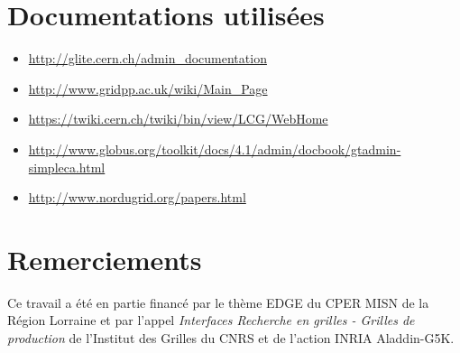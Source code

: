 \documentclass[a4paper,11pt]{article}
\begin{document}
\section{Documentations utilisées}
\begin{itemize}
\item \url{http://glite.cern.ch/admin_documentation}
\item \url{http://www.gridpp.ac.uk/wiki/Main_Page}
\item \url{https://twiki.cern.ch/twiki/bin/view/LCG/WebHome}
\item \url{http://www.globus.org/toolkit/docs/4.1/admin/docbook/gtadmin-simpleca.html}
\item \url{http://www.nordugrid.org/papers.html}
\end{itemize}

\section*{Remerciements}

Ce travail a été en partie financé par le thème EDGE du CPER MISN de la Région
Lorraine et par l'appel \textsl{Interfaces Recherche en grilles - Grilles de
production} de l'Institut des Grilles du CNRS et de l'action INRIA Aladdin-G5K.



\end{document}
